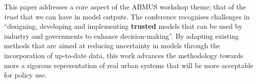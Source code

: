 \documentclass[runningheads]{llncs}
\begin{document}
This paper addresses a core aspect of the ABMUS workshop theme; that of the \textit{trust} that we can have in model outputs. The conference recognises challenges in ``designing, developing and implementing \textbf{trusted} models that can be used by industry and governments to enhance decision-making''. By adapting existing methods that are aimed at reducing uncertainty in models through the incorporation of up-to-date data, this work advances the methodology towards more a rigorous representation of real urban systems that will be more acceptable for policy use.
%
%
%
%
\end{document}
